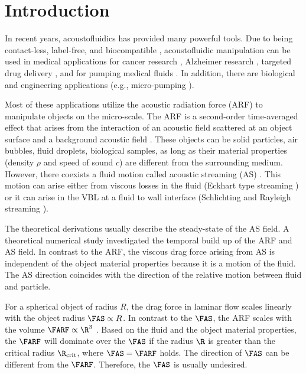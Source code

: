 \section{Introduction\label{sec:TC-introduction}}

In recent years, acoustofluidics has provided many powerful tools. Due to being 
contact-less, label-free, and biocompatible 
\cite{Antfolk2015,Abdulla2020,Zielke2020,Binkley2020,Cai2020}, acoustofluidic 
manipulation can be used in medical applications for cancer research
\cite{Antfolk2015,Abdulla2020,Zielke2020,Binkley2020}, Alzheimer research 
\cite{Cai2020}, targeted drug delivery \cite{Bose2015}, and for pumping medical 
fluids \cite{Wu2019}. In addition, there are biological 
\cite{Gerlt2020,Xie2019} and engineering applications (e.g., micro-pumping 
\cite{Wu2019,Huang2014,Lin2019,Ozcelik2021}).

Most of these applications utilize the acoustic radiation force (ARF) to 
manipulate objects on the micro-scale. The ARF is a second-order time-averaged 
effect that arises from the interaction of an acoustic field scattered at an 
object surface and a background acoustic field 
\cite{Doinikov1994Rigid,Hasegawa1969,Yosioka1955,Gorkov1962,Bruus2012}.
These objects can be solid particles, air bubbles, fluid droplets, biological 
samples, as long as their material properties (density $\rho$ and speed of 
sound $c$) are different from the surrounding medium. However, there coexists 
a fluid motion called acoustic streaming (AS) 
\cite{Nyborg1965,Kolb1956,Nyborg1953}. This motion can arise either from
viscous losses in the fluid (Eckhart type streaming \cite{Eckart1948}) or it 
can arise in the VBL at a fluid to wall interface 
(Schlichting and Rayleigh streaming \cite{Riley1998,Schlichting1932}).


The theoretical derivations usually describe the steady-state of the AS field. 
A theoretical numerical study \cite{Muller2015} investigated the temporal build 
up of the ARF and AS field. In contrast to the ARF, the viscous drag force 
arising from AS is independent of the object material properties because it is 
a motion of the fluid. The AS direction coincides with the direction of the 
relative motion between fluid and particle.

For a spherical object of radius $R$, the drag force in laminar flow scales 
linearly with the object radius $\FAS \propto R$. In contrast to the $\FAS$, 
the ARF scales with the volume $\FARF \propto \R^{3}$ \cite{Bruus2012-10}.  
Based on the fluid and the object material properties, the $\FARF$ will 
dominate over the $\FAS$ if the radius $\R$ is greater than the critical radius 
$\R_{\text{crit}}$, where $\FAS = \FARF$ holds. The direction of $\FAS$ can be 
different from the $\FARF$. Therefore, the $\FAS$ is usually undesired.

